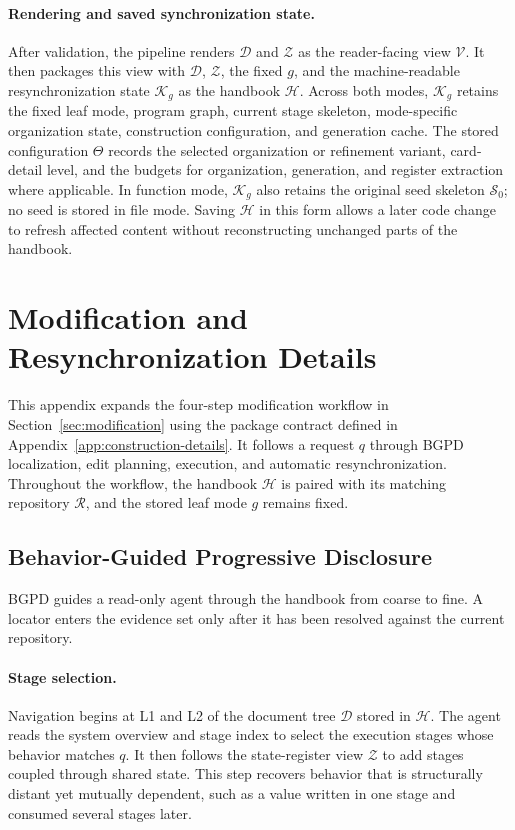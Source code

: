 \documentclass[]{ailab}
\begin{document}
\paragraph{Rendering and saved synchronization state.}
After validation, the pipeline renders $\mathcal{D}$ and $\mathcal{Z}$ as the
reader-facing view $\mathcal{V}$. It then packages this view with $\mathcal{D}$,
$\mathcal{Z}$, the fixed $g$, and the machine-readable resynchronization state
$\mathcal{K}_g$ as the handbook $\mathcal{H}$. Across both modes, $\mathcal{K}_g$
retains the fixed leaf mode, program graph, current stage skeleton, mode-specific
organization state, construction configuration, and generation cache. The
stored configuration $\Theta$ records the selected organization or refinement
variant, card-detail level, and the budgets for organization, generation, and
register extraction where applicable. In function mode,
$\mathcal{K}_g$ also retains the original seed skeleton $\mathcal{S}_0$; no seed
is stored in file mode. Saving $\mathcal{H}$ in this form allows a later code
change to refresh affected content without reconstructing unchanged parts of
the handbook.

\section{Modification and Resynchronization Details}
\label{app:modification-details}

This appendix expands the four-step modification workflow in
Section~\ref{sec:modification} using the package contract defined in
Appendix~\ref{app:construction-details}. It follows a request $q$ through BGPD
localization, edit planning, execution, and automatic resynchronization.
Throughout the workflow, the handbook $\mathcal{H}$ is paired with its matching
repository $\mathcal{R}$, and the stored leaf mode $g$ remains fixed.

\subsection{Behavior-Guided Progressive Disclosure}

BGPD guides a read-only agent through the handbook from coarse to fine. A
locator enters the evidence set only after it has been resolved against the
current repository.

\paragraph{Stage selection.}
Navigation begins at L1 and L2 of the document tree $\mathcal{D}$ stored in
$\mathcal{H}$. The agent reads the system overview and stage index to select the
execution stages whose behavior matches $q$. It then follows the state-register
view $\mathcal{Z}$ to add stages coupled through shared state. This step recovers
behavior that is structurally distant yet mutually dependent, such as a value
written in one stage and consumed several stages later.
\end{document}
